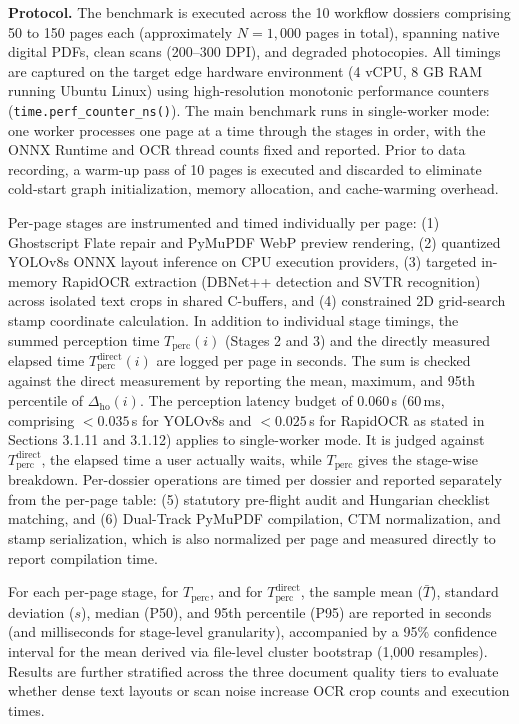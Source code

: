 \textbf{Protocol.} The benchmark is executed across the 10 workflow dossiers comprising 50 to 150 pages each (approximately $N=1{,}000$ pages in total), spanning native digital PDFs, clean scans (200--300 DPI), and degraded photocopies. All timings are captured on the target edge hardware environment (4 vCPU, 8 GB RAM running Ubuntu Linux) using high-resolution monotonic performance counters (\texttt{time.perf\_counter\_ns()}). The main benchmark runs in single-worker mode: one worker processes one page at a time through the stages in order, with the ONNX Runtime and OCR thread counts fixed and reported. Prior to data recording, a warm-up pass of 10 pages is executed and discarded to eliminate cold-start graph initialization, memory allocation, and cache-warming overhead.

Per-page stages are instrumented and timed individually per page: (1) Ghostscript Flate repair and PyMuPDF WebP preview rendering, (2) quantized YOLOv8s ONNX layout inference on CPU execution providers, (3) targeted in-memory RapidOCR extraction (DBNet++ detection and SVTR recognition) across isolated text crops in shared C-buffers, and (4) constrained 2D grid-search stamp coordinate calculation. In addition to individual stage timings, the summed perception time $T_{\mathrm{perc}}(i)$ (Stages 2 and 3) and the directly measured elapsed time $T_{\mathrm{perc}}^{\mathrm{direct}}(i)$ are logged per page in seconds. The sum is checked against the direct measurement by reporting the mean, maximum, and 95th percentile of $\Delta_{\mathrm{ho}}(i)$. The perception latency budget of 0.060\,s (60\,ms, comprising $<0.035$\,s for YOLOv8s and $<0.025$\,s for RapidOCR as stated in Sections 3.1.11 and 3.1.12) applies to single-worker mode. It is judged against $T_{\mathrm{perc}}^{\mathrm{direct}}$, the elapsed time a user actually waits, while $T_{\mathrm{perc}}$ gives the stage-wise breakdown. Per-dossier operations are timed per dossier and reported separately from the per-page table: (5) statutory pre-flight audit and Hungarian checklist matching, and (6) Dual-Track PyMuPDF compilation, CTM normalization, and stamp serialization, which is also normalized per page and measured directly to report compilation time.

For each per-page stage, for $T_{\mathrm{perc}}$, and for $T_{\mathrm{perc}}^{\mathrm{direct}}$, the sample mean ($\bar T$), standard deviation ($s$), median (P50), and 95th percentile (P95) are reported in seconds (and milliseconds for stage-level granularity), accompanied by a 95\% confidence interval for the mean derived via file-level cluster bootstrap (1,000 resamples). Results are further stratified across the three document quality tiers to evaluate whether dense text layouts or scan noise increase OCR crop counts and execution times.


